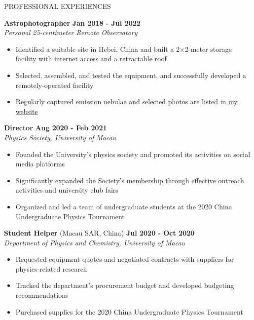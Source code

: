 \documentclass[10pt]{article} %
\begin{document}
\begin{section}{PROFESSIONAL EXPERIENCES}

\textbf{Astrophotographer} \hfill \textbf{Jan 2018 - Jul 2022}  \\
\textit{Personal 25-centimeter Remote Observatory} 
\begin{itemize}[leftmargin=1.5em]
    \item Identified a suitable site in Hebei, China and built a 2$\times$2-meter storage facility with internet access and a retractable roof
    \item Selected, assembled, and tested the equipment, and successfully developed a remotely-operated facility
    \item Regularly captured emission nebulae and selected photos are listed in \href{https://cheysen.fit/astrophotography/}{my website}
\end{itemize}

\textbf{Director} \hfill \textbf{Aug 2020 - Feb 2021} \\
\textit{Physics Society, University of Macau}
\begin{itemize}[leftmargin=1.5em]
    \item Founded the University's physics society and promoted its activities on social media platforms
    \item Significantly expanded the Society's membership through effective outreach activities and university club fairs
    \item Organized and led a team of undergraduate students at the 2020 China Undergraduate Physics Tournament
\end{itemize}

\textbf{Student Helper} (Macau SAR, China) \hfill \textbf{Jul 2020 - Oct 2020} \\
\textit{Department of Physics and Chemistry, University of Macau} 
\begin{itemize}[leftmargin=1.5em]
    \item Requested equipmrnt quotes and negotiated contracts with suppliers for physics-related research 
    \item Tracked the department's procurement budget and developed budgeting recommendations
    \item Purchased supplies for the 2020 China Undergraduate Physics Tournament
\end{itemize}

\end{section}
\end{document}
